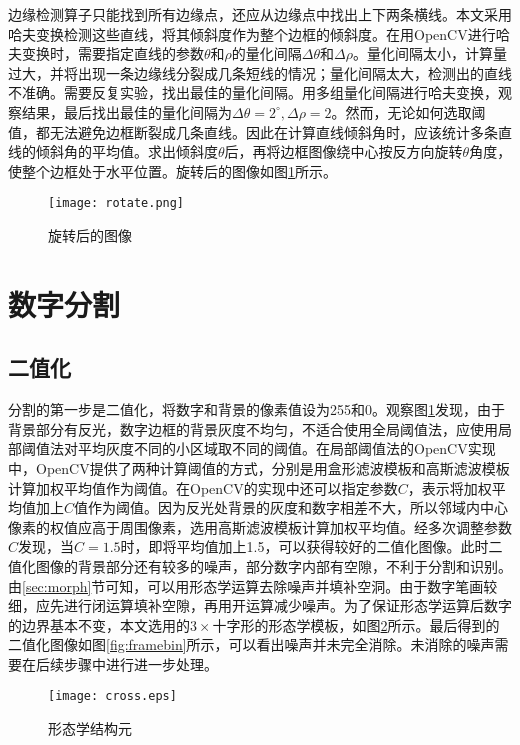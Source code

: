 边缘检测算子只能找到所有边缘点，还应从边缘点中找出上下两条横线。本文采用哈夫变换检测这些直线，将其倾斜度作为整个边框的倾斜度。在用OpenCV进行哈夫变换时，需要指定直线的参数$\theta$和$\rho$的量化间隔$\Delta\theta$和$\Delta\rho$。量化间隔太小，计算量过大，并将出现一条边缘线分裂成几条短线的情况；量化间隔太大，检测出的直线不准确。需要反复实验，找出最佳的量化间隔。用多组量化间隔进行哈夫变换，观察结果，最后找出最佳的量化间隔为$\Delta\theta=2^\circ,\Delta\rho=2$。然而，无论如何选取阈值，都无法避免边框断裂成几条直线。因此在计算直线倾斜角时，应该统计多条直线的倾斜角的平均值。求出倾斜度$\theta$后，再将边框图像绕中心按反方向旋转$\theta$角度，使整个边框处于水平位置。旋转后的图像如图\ref{fig:rotate}所示。
\begin{figure}[h]
  \centering
  \texttt{[image: rotate.png]}
  \caption{旋转后的图像}
  \label{fig:rotate}
\end{figure}

\section{数字分割}


\subsection{二值化}


分割的第一步是二值化，将数字和背景的像素值设为255和0。观察图\ref{fig:rotate}发现，由于背景部分有反光，数字边框的背景灰度不均匀，不适合使用全局阈值法，应使用局部阈值法对平均灰度不同的小区域取不同的阈值。在局部阈值法的OpenCV实现中，OpenCV提供了两种计算阈值的方式，分别是用盒形滤波模板和高斯滤波模板计算加权平均值作为阈值。在OpenCV的实现中还可以指定参数$C$，表示将加权平均值加上$C$值作为阈值。因为反光处背景的灰度和数字相差不大，所以邻域内中心像素的权值应高于周围像素，选用高斯滤波模板计算加权平均值。经多次调整参数$C$发现，当$C=1.5$时，即将平均值加上1.5，可以获得较好的二值化图像。此时二值化图像的背景部分还有较多的噪声，部分数字内部有空隙，不利于分割和识别。由\ref{sec:morph}节可知，可以用形态学运算去除噪声并填补空洞。由于数字笔画较细，应先进行闭运算填补空隙，再用开运算减少噪声。为了保证形态学运算后数字的边界基本不变，本文选用的$3\times $十字形的形态学模板，如图\ref{fig:morph}所示。最后得到的二值化图像如图\ref{fig:framebin}所示，可以看出噪声并未完全消除。未消除的噪声需要在后续步骤中进行进一步处理。
\begin{figure}[h]
  \centering
  \texttt{[image: cross.eps]}
  \caption{形态学结构元}
  \label{fig:morph}
\end{figure}

